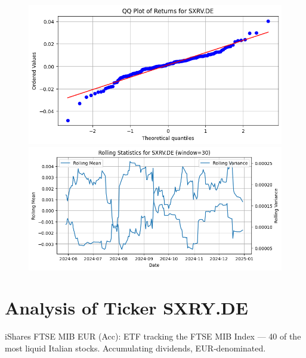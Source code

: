 \documentclass{article}%
\begin{document}
%


\begin{figure}[htbp]%
\begin{minipage}{0.31\textwidth}%
\includegraphics[width=\linewidth]{ticker_images/SXRV.DE_qq_plot.png}%
\end{minipage}%
\begin{minipage}{0.31\textwidth}%
\includegraphics[width=\linewidth]{ticker_images/SXRV.DE_rolling_stats.png}%
\end{minipage}%
\end{figure}

%
\section*{Analysis of Ticker SXRY.DE}%
\label{sec:AnalysisofTickerSXRY.DE}%
iShares FTSE MIB EUR (Acc): ETF tracking the FTSE MIB Index — 40 of the most liquid Italian stocks. Accumulating dividends, EUR‑denominated.%
\end{document}
